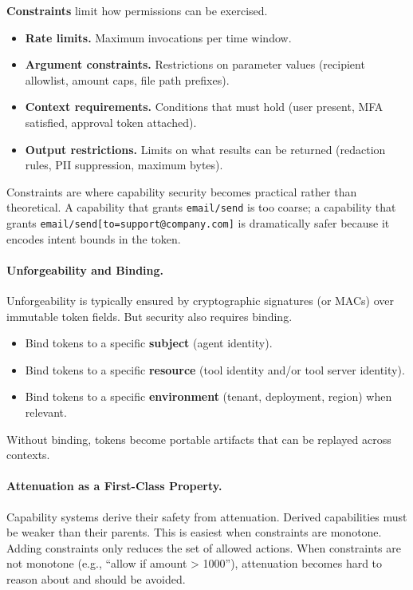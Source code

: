 \textbf{Constraints} limit how permissions can be exercised.
\begin{itemize}
\item \textbf{Rate limits.} Maximum invocations per time window.
\item \textbf{Argument constraints.} Restrictions on parameter values (recipient allowlist, amount caps, file path prefixes).
\item \textbf{Context requirements.} Conditions that must hold (user present, MFA satisfied, approval token attached).
\item \textbf{Output restrictions.} Limits on what results can be returned (redaction rules, PII suppression, maximum bytes).
\end{itemize}

Constraints are where capability security becomes practical rather than theoretical. A capability that grants \texttt{email/send} is too coarse; a capability that grants \texttt{email/send[to=support@company.com]} is dramatically safer because it encodes intent bounds in the token.

\paragraph{Unforgeability and Binding.}
Unforgeability is typically ensured by cryptographic signatures (or MACs) over immutable token fields. But security also requires binding.
\begin{itemize}
\item Bind tokens to a specific \textbf{subject} (agent identity).
\item Bind tokens to a specific \textbf{resource} (tool identity and/or tool server identity).
\item Bind tokens to a specific \textbf{environment} (tenant, deployment, region) when relevant.
\end{itemize}
Without binding, tokens become portable artifacts that can be replayed across contexts.

\paragraph{Attenuation as a First-Class Property.}
Capability systems derive their safety from attenuation. Derived capabilities must be weaker than their parents. This is easiest when constraints are monotone. Adding constraints only reduces the set of allowed actions. When constraints are not monotone (e.g., ``allow if amount > 1000''), attenuation becomes hard to reason about and should be avoided.

